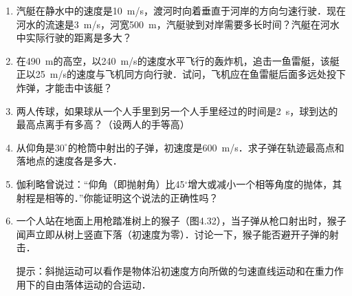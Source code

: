 \begin{exercises}
\begin{enumerate}
    \item 汽艇在静水中的速度是\SI{10}{m/s}，渡河时向着垂直于河岸的方向匀速行驶．现在河水的流速是\SI{3}{m/s}，河宽\SI{500}{m}，汽艇驶到对岸需要多长时间？汽艇在河水中实际行驶的距离是多大？
    \item 在\SI{490}{m}的高空，以\SI{240}{m/s}的速度水平飞行的轰炸机，追击一鱼雷艇，该艇正以\SI{25}{m/s}的速度与飞机同方向行驶．试问，飞机应在鱼雷艇后面多远处投下炸弹，才能击中该艇？
    \item 两人传球，如果球从一个人手里到另一个人手里经过的时间是\SI{2}{s}，球到达的最高点离手有多高？（设两人的手等高）
    \item 从仰角是$30^\circ$的枪筒中射出的子弹，初速度是\SI{600}{m/s}．求子弹在轨迹最高点和落地点的速度各是多大．
    \item 伽利略曾说过：“仰角（即抛射角）比45$^\circ$增大或减小一个相等角度的抛体，其射程是相等的．”你能证明这个说法的正确性吗？
    \item 一个人站在地面上用枪踏准树上的猴子（图4.32），当子弹从枪口射出时，猴子闻声立即从树上竖直下落（初速度为零）．讨论一下，猴子能否避开子弹的射击．

          提示：斜抛运动可以看作是物体沿初速度方向所做的匀速直线运动和在重力作用下的自由落体运动的合运动．


\end{enumerate}
\end{exercises}
